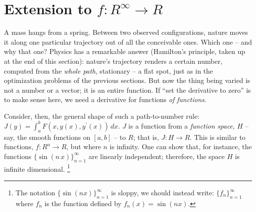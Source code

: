 \documentclass{article}
\begin{document}
\section{Extension to $f:R^\infty \rightarrow R$}
A mass hangs from a spring. Between two observed configurations, nature
moves it along one particular trajectory out of all the conceivable ones.
Which one -- and why that one? Physics has a remarkable answer (Hamilton's
principle, taken up at the end of this section): nature's trajectory
renders a certain number, computed from the {\em whole path\/}, stationary
-- a flat spot, just as in the optimization problems of the previous
sections. But now the thing being varied is not a number or a vector; it
is an entire function. If ``set the derivative to zero''{} is to make
sense here, we need a derivative for functions {\em of functions\/}.

Consider, then, the general shape of such a path-to-number rule:
$J(y) = \int_{a}^b F(x, y(x), y^\prime(x)) \, dx$. $J$ is
a function from a {\em function space\/}, $H$ -- say, the smooth functions on
$[a,b]$ -- to $R$; that is, $J: H \rightarrow R$.
This is similar to functions,
$f:R^n \rightarrow R$, but where $n$ is infinity. One can show that, for instance, the
functions $\{\sin(n\, x)\}_{n=1}^\infty$ are linearly independent; therefore,
the space $H$ is infinite dimensional.%
\footnote{The notation $\{\sin(n x)\}_{n=1}^\infty$ is sloppy, we should instead write:
$\{f_n\}_{n=1}^\infty$ where $f_n$ is the function defined by $f_n(x) = \sin(n x)$.}
\end{document}
